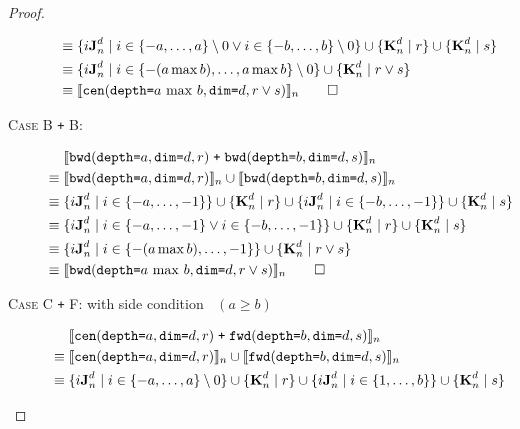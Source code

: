 \begin{proof}
\begin{description}
\begin{align*}
      \equiv & \; \{i\singleEntry{d}{n} \mid i \in \{-a, \ldots, a\} \setminus 0 \vee
                                             i \in \{-b, \ldots, b\} \setminus 0 \} \cup
                 \{\zeroEntry{d}{n} \mid r \} \cup \{\zeroEntry{d}{n} \mid s \} \\
      \equiv & \; \{i\singleEntry{d}{n} \mid i \in \{-(a \max b), \ldots, a \max b\} \setminus 0 \} \cup 
                  \{\zeroEntry{d}{n} \mid r \vee s \}\\
      \equiv & \; \interp{\stenCenSR{a \, \max \, b}{d}{r \vee s}}_n \qed
    \end{align*}
  \item[\textsc{Case B \texttt{+} B}:]
    \begin{align*}
      & \; \interp{\stenBwdSR{a}{d}{r} \; \texttt{+} \; \stenBwdSR{b}{d}{s}}_{n} \\
      \equiv & \; \interp{\stenBwdSR{a}{d}{r}}_{n} \cup \interp{\stenBwdSR{b}{d}{s}}_{n} \\
      \equiv & \; \{i\singleEntry{d}{n} \mid i \in \{-a, \ldots, -1\} \} \cup
                  \{\zeroEntry{d}{n} \mid r \} \cup
                  \{i\singleEntry{d}{n} \mid i \in \{-b, \ldots, -1\} \} \cup
                  \{\zeroEntry{d}{n} \mid s \} \\
      \equiv & \; \{i\singleEntry{d}{n} \mid i \in \{-a, \ldots, -1\} \vee
                                             i \in \{-b, \ldots, -1\} \} \cup
                  \{\zeroEntry{d}{n} \mid r \} \cup \{\zeroEntry{d}{n} \mid s \} \\
      \equiv & \; \{i\singleEntry{d}{n} \mid i \in \{-(a \max b), \ldots, -1 \} \} \cup 
                  \{\zeroEntry{d}{n} \mid r \vee s \}\\
      \equiv & \; \interp{\stenBwdSR{a \, \max \, b}{d}{r \vee s}}_n \qed
    \end{align*}
  \item[\textsc{Case C \texttt{+} F}: with side condition  $\;\;(a \geq b)$]
    \begin{align*}
      & \; \interp{\stenCenSR{a}{d}{r} \; \texttt{+} \; \stenFwdSR{b}{d}{s}}_{n} \\
      \equiv & \; \interp{\stenCenSR{a}{d}{r}}_{n} \cup \interp{\stenFwdSR{b}{d}{s}}_{n} \\
      \equiv & \; \{i\singleEntry{d}{n} \mid i \in \{-a, \ldots, a\} \setminus 0 \} \cup
                  \{\zeroEntry{d}{n} \mid r \} \cup
                  \{i\singleEntry{d}{n} \mid i \in \{1, \ldots, b\} \} \cup
                  \{\zeroEntry{d}{n} \mid s \} \\

\end{align*}
\end{description}
\end{proof}
